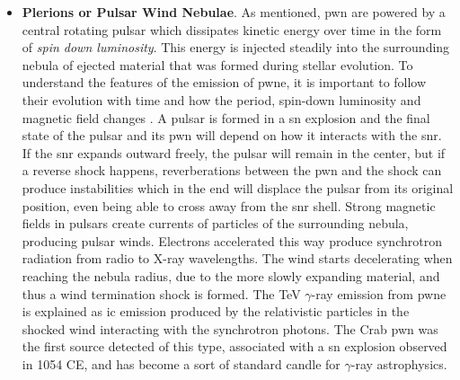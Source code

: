 \documentclass[main.tex]{subfiles}
\begin{document}
\begin{itemize}
    A more detailed analysis using real data of galactic \gls{snr} was done by \cite{2016originCR} concluding that future $\gamma$-ray data can be used to constrain the amount of \gls{cr} energy coming from \gls{snr}. However, there are still problems with proving this hypothesis because many of the $\gamma$-ray signatures coming from \gls{snr} have a leptonic origin rather than hadronic. Also, for \glspl{snr} to reproduce the full spectrum of \gls{cr}, \glspl{snr} should be pevatrons (meaning they can accelerate \gls{cr} to PeV energies) at some fraction of their lifetimes, to reach the region after the \textit{knee}. Still, no \gls{snr} pevatron has been observed yet but high hopes are deposited in the next generation of $\gamma$-ray experiments \cite{2018SNRPevatrons}.
    \item \textbf{Plerions or Pulsar Wind Nebulae}. As mentioned, \gls{pwn} are powered by a central rotating pulsar which dissipates kinetic energy over time in the form of \textit{spin down luminosity}. This energy is injected steadily into the surrounding nebula of ejected material that was formed during stellar evolution. To understand the features of the emission of \gls{pwne}, it is important to follow their evolution with time and how the period, spin-down luminosity and magnetic field changes \cite{2006PWNe}. A pulsar is formed in a \gls{sn} explosion and the final state of the pulsar and its \gls{pwn} will depend on how it interacts with the \gls{snr}. If the \gls{snr} expands outward freely, the pulsar will remain in the center, but if a reverse shock happens, reverberations between the \gls{pwn} and the shock can produce instabilities which in the end will displace the pulsar from its original position, even being able to cross away from the \gls{snr} shell.
    Strong magnetic fields in pulsars create currents of particles of the surrounding nebula, producing pulsar winds. Electrons accelerated this way produce synchrotron radiation from radio to X-ray wavelengths. The wind starts decelerating when reaching the nebula radius, due to the more slowly expanding material, and thus a wind termination shock is formed. The TeV $\gamma$-ray emission from \gls{pwne} is explained as \gls{ic} emission produced by the relativistic particles in the shocked wind interacting with the synchrotron photons.
    The Crab \gls{pwn} was the first source detected of this type, associated with a \gls{sn} explosion observed in 1054 CE, and has become a sort of standard candle for $\gamma$-ray astrophysics.
    

\end{itemize}
\end{document}
